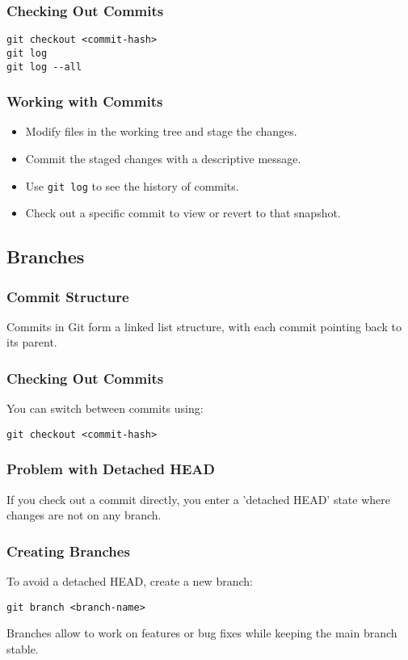 \documentclass[12pt]{article}
\begin{document}
\subsubsection{Checking Out Commits}
\begin{lstlisting}
git checkout <commit-hash>
git log
git log --all
\end{lstlisting}

\subsubsection{Working with Commits}
\begin{itemize}
    \item Modify files in the working tree and stage the changes.
    \item Commit the staged changes with a descriptive message.
    \item Use \texttt{git log} to see the history of commits.
    \item Check out a specific commit to view or revert to that snapshot.
\end{itemize}


\subsection{Branches}

\subsubsection{Commit Structure}
Commits in Git form a linked list structure, with each commit pointing back to its parent.

\subsubsection{Checking Out Commits}
You can switch between commits using:
\begin{lstlisting}
git checkout <commit-hash>
\end{lstlisting}

\subsubsection{Problem with Detached HEAD}
If you check out a commit directly, you enter a 'detached HEAD' state where changes are not on any branch.

\subsubsection{Creating Branches}
To avoid a detached HEAD, create a new branch:
\begin{lstlisting}
git branch <branch-name>
\end{lstlisting}
Branches allow to work on features or bug fixes while keeping the main branch stable.
\end{document}
